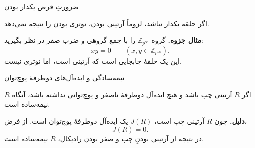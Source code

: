 \begin{frame}[t]{ضرورتِ فرض یکدار بودن}
\label{lec15:nonunital-counterexample}
\begin{remark}
اگر حلقه یکدار نباشد، لزوماً آرتینی بودن، نوتری بودن را نتیجه نمی‌دهد.
\end{remark}
\textbf{مثال جزوه.} گروه \(\mathbb Z_{p^\infty}\) را با جمع گروهی و ضرب صفر در نظر بگیرید:
\[
 xy=0\qquad(x,y\in\mathbb Z_{p^\infty}).
\]
این یک حلقهٔ جابجایی است که آرتینی است، اما نوتری نیست.
\end{frame}

\begin{frame}[t]{نیمه‌سادگی و ایده‌آل‌های دوطرفهٔ پوچ‌توان}
\label{lec15:no-nilpotent-ideals}
\begin{remark}
اگر \(R\) آرتینی چپ باشد و هیچ ایده‌آل دوطرفهٔ ناصفر و پوچ‌توانی نداشته باشد، آنگاه \(R\) نیمه‌ساده است.
\end{remark}
\textbf{دلیل.} چون \(R\) آرتینی چپ است، \(J(R)\) یک ایده‌آل دوطرفهٔ پوچ‌توان است.
از فرض،
\[
 J(R)=0.
\]
در نتیجه از آرتینی بودنِ چپ و صفر بودن رادیکال، \(R\) نیمه‌ساده است.
\end{frame}
